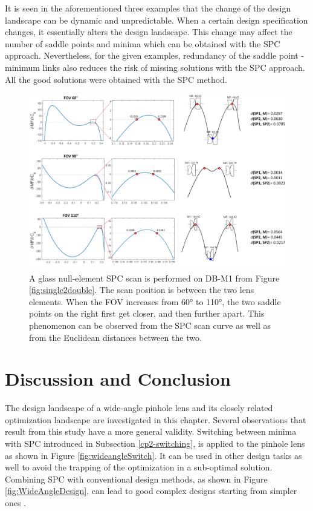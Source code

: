 It is seen in the aforementioned three examples that the change of the design landscape can be dynamic and unpredictable. When a certain design specification changes, it essentially alters the design landscape. This change may affect the number of saddle points and minima which can be obtained with the SPC approach. Nevertheless, for the given examples, redundancy of the saddle point - minimum links also reduces the risk of missing solutions with the SPC approach. All the good solutions were obtained with the SPC method.
\begin{figure}[h!]
    \centering
    \setlength{\belowcaptionskip}{-10pt}
    \setlength{\abovecaptionskip}{2pt}
    \includegraphics[width=1.0\textwidth]{chapter-3/figures/SystemReborn_vt.png}
    \caption{A glass null-element SPC scan is performed on DB-M1 from Figure \ref{fig:single2double}. The scan position is between the two lens elements. When the FOV increases from 60° to 110°, the two saddle points on the right first get closer, and then further apart. This phenomenon can be observed from the SPC scan curve as well as from the Euclidean distances between the two.}
    \label{fig:systemreborn}
\end{figure}

\newpage
\section{Discussion and Conclusion}
The design landscape of a wide-angle pinhole lens and its closely related optimization landscape are investigated in this chapter. Several observations that result from this study have a more general validity. Switching between minima with SPC introduced in Subsection \ref{cp2-switching}, is applied to the pinhole lens as shown in Figure \ref{fig:wideangleSwitch}. It can be used in other design tasks as well to avoid the trapping of the optimization in a sub-optimal solution. Combining SPC with conventional design methods, as shown in Figure \ref{fig:WideAngleDesign}, can lead to good complex designs starting from simpler ones \cite{LivshitsSP2014}.


